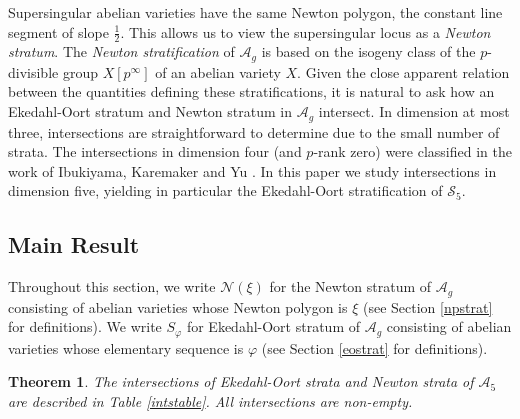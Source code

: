 \documentclass[11pt,table]{amsart}
\numberwithin{equation}{section}
\newtheorem{thm}{Theorem}
\theoremstyle{definition}
\theoremstyle{remark}
\theoremstyle{remark}
\begin{document}
Supersingular abelian varieties have the same Newton polygon, the constant line segment of slope $\frac{1}{2}$. This allows us to view the supersingular locus as a \textit{Newton stratum}. The \textit{Newton stratification} of $\mathcal{A}_g$ is based on the isogeny class of the $p$-divisible group $X[p^{\infty}]$ of an abelian variety $X$. Given the close apparent relation between the quantities defining these stratifications, it is natural to ask how an Ekedahl-Oort stratum and Newton stratum in $\mathcal{A}_g$ intersect.  In dimension at most three, intersections are straightforward to determine due to the small number of strata. The intersections in dimension four (and $p$-rank zero) were classified in the work of Ibukiyama, Karemaker and Yu \cite{ibukiyama2022polarised}. In this paper we study intersections in dimension five, yielding in particular the Ekedahl-Oort stratification of $\mathcal{S}_5$. 


\subsection{Main Result}
Throughout this section, we write $\mathcal{N}(\xi)$ for the Newton stratum of $\mathcal{A}_g$ consisting of abelian varieties whose Newton polygon is $\xi$ (see Section \ref{npstrat} for definitions).
We write $S_{\varphi}$ for Ekedahl-Oort stratum of $\mathcal{A}_g$ consisting of abelian varieties whose elementary sequence is $\varphi$ (see Section \ref{eostrat} for definitions). 


\begin{thm} \label{mainthm}
  The intersections of Ekedahl-Oort strata and Newton strata of $\mathcal{A}_5$ are described in Table \ref{intstable}. All intersections are non-empty.
\end{thm}
\end{document}
